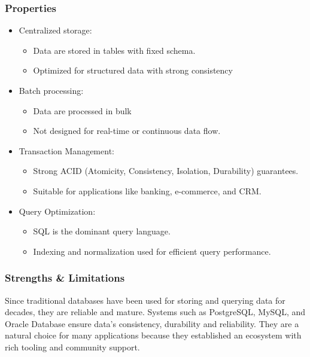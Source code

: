 \documentclass[utf8,9pt]{extarticle}
\begin{document}
\subsubsection{Properties}
\begin{itemize}
    \item Centralized storage:
        \begin{itemize}
        \item Data are stored in tables with fixed schema.
        \item Optimized for structured data with strong consistency
        \end{itemize}
    \item Batch processing:
        \begin{itemize}
        \item Data are processed in bulk
        \item Not designed for real-time or continuous data flow.
        \end{itemize}
    \item Transaction Management:
        \begin{itemize}
        \item Strong ACID (Atomicity, Consistency, Isolation, Durability) guarantees.
        \item Suitable for applications like banking, e-commerce, and CRM.
        \end{itemize}
    \item Query Optimization:
        \begin{itemize}
        \item SQL is the dominant query language.
        \item Indexing and normalization used for efficient query performance.
        \end{itemize}
\end{itemize}

\subsubsection{Strengths \& Limitations}
\hspace{2mm}  Since traditional databases have been used for storing and querying data for decades, they are reliable and mature. Systems such as PostgreSQL, MySQL, and Oracle Database ensure data's consistency, durability and reliability. They are a natural choice for many applications because they established an ecosystem with rich tooling and community support.
\end{document}
